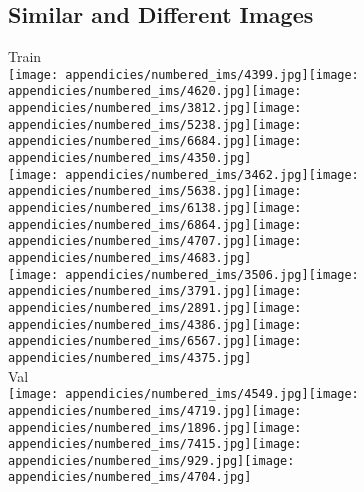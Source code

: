 \documentclass[letterpaper, 11pt]{IEEEtran}
\begin{document}
\subsection{Similar and Different Images}\label{similaranddifferent}
\begin{figure*}[!ht]
    \centering
    \fontsize{9}{9}\selectfont
    Train \\ \vspace{0.25em}
\texttt{[image: appendicies/numbered\_ims/4399.jpg]}\texttt{[image: appendicies/numbered\_ims/4620.jpg]}\texttt{[image: appendicies/numbered\_ims/3812.jpg]}\texttt{[image: appendicies/numbered\_ims/5238.jpg]}\texttt{[image: appendicies/numbered\_ims/6684.jpg]}\texttt{[image: appendicies/numbered\_ims/4350.jpg]}\\
\vspace{-0.5em}
\texttt{[image: appendicies/numbered\_ims/3462.jpg]}\texttt{[image: appendicies/numbered\_ims/5638.jpg]}\texttt{[image: appendicies/numbered\_ims/6138.jpg]}\texttt{[image: appendicies/numbered\_ims/6864.jpg]}\texttt{[image: appendicies/numbered\_ims/4707.jpg]}\texttt{[image: appendicies/numbered\_ims/4683.jpg]}\\
\vspace{-0.5em}
\texttt{[image: appendicies/numbered\_ims/3506.jpg]}\texttt{[image: appendicies/numbered\_ims/3791.jpg]}\texttt{[image: appendicies/numbered\_ims/2891.jpg]}\texttt{[image: appendicies/numbered\_ims/4386.jpg]}\texttt{[image: appendicies/numbered\_ims/6567.jpg]}\texttt{[image: appendicies/numbered\_ims/4375.jpg]}\\
Val \\ \vspace{0.25em}
\texttt{[image: appendicies/numbered\_ims/4549.jpg]}\texttt{[image: appendicies/numbered\_ims/4719.jpg]}\texttt{[image: appendicies/numbered\_ims/1896.jpg]}\texttt{[image: appendicies/numbered\_ims/7415.jpg]}\texttt{[image: appendicies/numbered\_ims/929.jpg]}\texttt{[image: appendicies/numbered\_ims/4704.jpg]}\\

\end{figure*}
\end{document}
